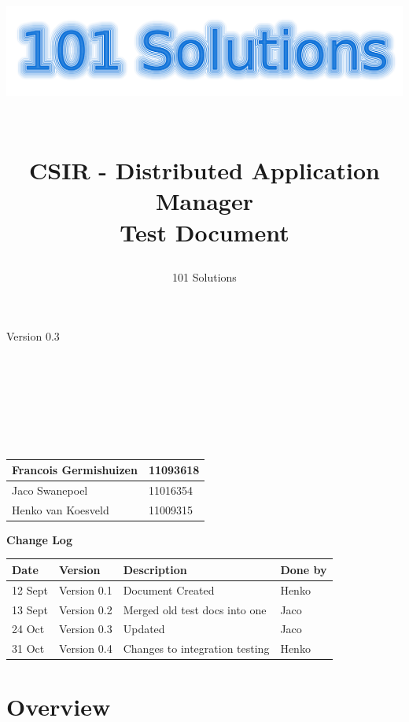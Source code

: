 \documentclass[a4paper,12pt,final]{article}
\title{
\begin{center}
  	\includegraphics[scale=0.3]{101Logo.png} 
  \end{center}
  \textbf{\\}
CSIR - Distributed Application Manager\\
Test Document\\
}
\author{101 Solutions}
\begin{document}
\maketitle
\begin{center}
Version 0.3
\end{center}
\textbf{\\}
\textbf{\\}
\textbf{\\}
\textbf{\\}
\textbf{\\}
\textbf{\\}
\begin{center}
\begin{tabular}{|l|l|}
\hline
Francois Germishuizen & 11093618\\
\hline
Jaco Swanepoel & 11016354\\
\hline
Henko van Koesveld & 11009315\\
\hline
\end{tabular}
\end{center}
\thispagestyle{empty}
\newpage
\thispagestyle{empty}
\textbf{\large{Change Log}}
\vspace{6pt}\newline
\begin{tabular}{|l|l|l|l|}
\hline
\textbf{Date} & \textbf{Version} & \textbf{Description} & \textbf{Done by}\\
\hline
12 Sept & Version 0.1 & Document Created&Henko\\
\hline
13 Sept & Version 0.2 & Merged old test docs into one&Jaco\\
\hline
24 Oct & Version 0.3 & Updated&Jaco\\
\hline
31 Oct & Version 0.4 &  Changes to integration testing & Henko\\
\hline
\end{tabular}
\newpage
\tableofcontents
\thispagestyle{empty}
\newpage

\section{Overview}
\end{document}
